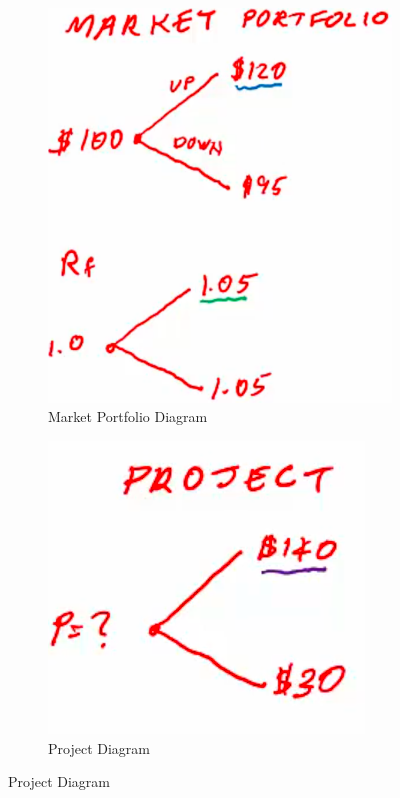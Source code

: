 \begin{example}
    \begin{figure}[h!]
        \centering
        \begin{subfigure}[b]{0.4\textwidth}
            \centering
            \includegraphics[width=\textwidth]{LECTURE_4/rep1.png}
            \caption{Market Portfolio Diagram}
            \label{fig:market_portfolio_diagram}
        \end{subfigure}
        \hfill
        \begin{subfigure}[b]{0.4\textwidth}
            \centering
            \includegraphics[width=\textwidth]{LECTURE_4/rep2.png}
            \caption{Project Diagram}
            \label{fig:project_diagram}
        \end{subfigure}


\end{figure}
\end{example}
